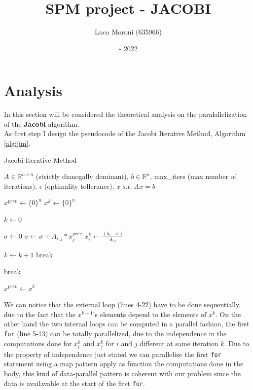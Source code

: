 \documentclass[12pt]{extarticle}
\title{SPM project - JACOBI}
\author{Luca Moroni (635966)}
\date{- 2022}
\begin{document}
\maketitle

\section{Analysis}
In this section will be considered the theoretical analysis on the paralallelization of the \textbf{Jacobi} algorithm.\\
As first step I design the pseudocode of the Jacobi Iterative Method, Algorithm \ref{alg:jim}.
\begin{algorithm}
\caption{Jacobi Iterative Method}\label{alg:jim}
\begin{algorithmic}[1]
\Require $A \in \mathbb{R}^{n \times n}$ (strictly dianogally dominant), $b \in \mathbb{R}^n$, max\_iters (max number of iterations), $\epsilon$ (optimality tollerance).
\Ensure $x \; s.t. \; Ax = b$

\State $x^{prev} \gets \{0\}^n$
\State $x^{k} \gets \{0\}^n$

\State $k \gets 0$

        \State $\sigma \gets 0$
                \State $\sigma \gets \sigma + A_{i, j} * x^{prev}_j$
            \EndIf
        \EndFor
        \State $x^k_i \gets \frac{(b_i - \sigma)}{A_{i,i}}$
    \EndFor
    
    \State $k \gets k+1$
        \State break
    \EndIf
    
        \State break
    \EndIf
    
    \State $x^{prev} \gets x^{k}$
\EndWhile
\end{algorithmic}
\end{algorithm}
We can notice that the external loop (lines 4-22) have to be done sequentially, due to the fact that the $x^{k+1}$'s elements depend to the elements of $x^k$. On the other hand the two internal loops can be computed in a parallel fashion, the first \texttt{for} (line 5-13) can be totally parallelized, due to the independence in the computations done for $x_i^k$ and $x_j^k$ for $i$ and $j$ different at same iteration $k$. Due to the property of independence just stated we can parallelize the first \texttt{for} statement using a map pattern apply as function the computations done in the body, this kind of data-parallel pattern is coherent with our problem since the data is availavable at the start of the first \texttt{for}.\\
\end{document}
